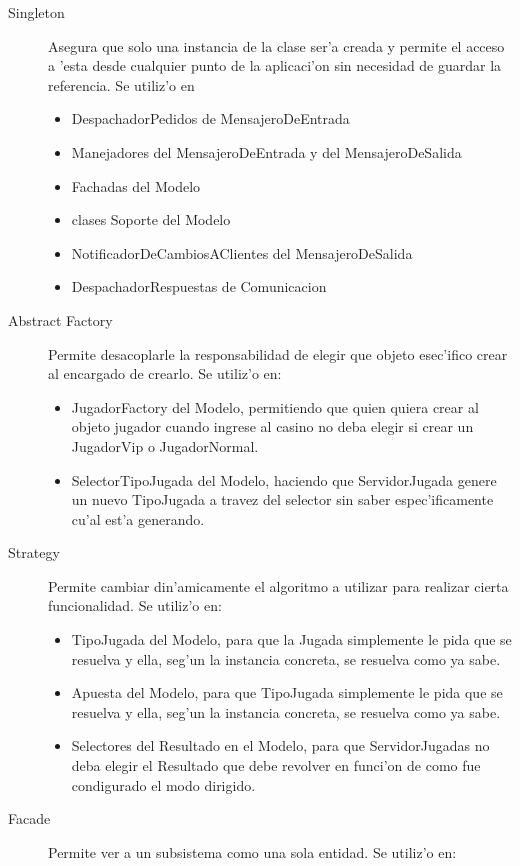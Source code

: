 \begin{description}
\item[Singleton] Asegura que solo una instancia de la clase ser'a creada y permite el acceso a 'esta desde cualquier punto de la aplicaci'on sin necesidad de guardar la referencia. Se utiliz'o en
	\begin{itemize}
	\item DespachadorPedidos de MensajeroDeEntrada
	\item Manejadores del MensajeroDeEntrada y del MensajeroDeSalida
	\item Fachadas del Modelo
	\item clases Soporte del Modelo
	\item NotificadorDeCambiosAClientes del MensajeroDeSalida
	\item DespachadorRespuestas de Comunicacion
	\end{itemize}
\item[Abstract Factory] Permite desacoplarle la responsabilidad de elegir que objeto esec'ifico crear al encargado de crearlo. Se utiliz'o en:
	\begin{itemize}
	\item JugadorFactory del Modelo, permitiendo que quien quiera crear al objeto jugador cuando ingrese al casino no deba elegir si crear un JugadorVip o JugadorNormal.
	\item SelectorTipoJugada del Modelo, haciendo que ServidorJugada genere un nuevo TipoJugada a travez del selector sin saber espec'ificamente cu'al est'a generando.
	\end{itemize}
\item[Strategy] Permite cambiar din'amicamente el algoritmo a utilizar para realizar cierta funcionalidad. Se utiliz'o en:
	\begin{itemize}
	\item TipoJugada del Modelo, para que la Jugada simplemente le pida que se resuelva y ella, seg'un la instancia concreta, se resuelva como ya sabe.
	\item Apuesta del Modelo, para que TipoJugada simplemente le pida que se resuelva y ella, seg'un la instancia concreta, se resuelva como ya sabe.
	\item Selectores del Resultado en el Modelo, para que ServidorJugadas no deba elegir el Resultado que debe revolver en funci'on de como fue condigurado el modo dirigido.
	\end{itemize}
\item[Facade] Permite ver a un subsistema como una sola entidad. Se utiliz'o en:

\end{description}
